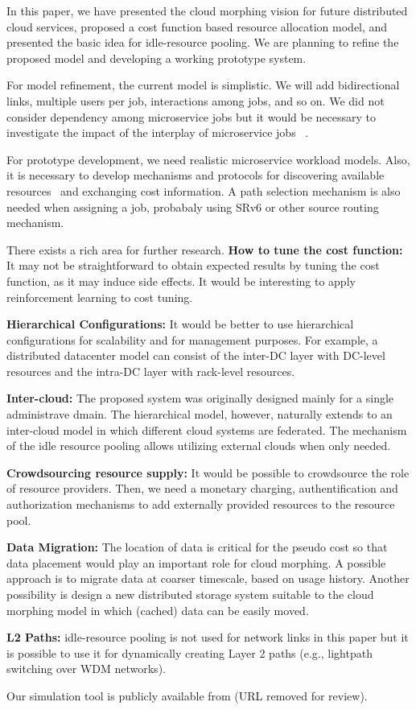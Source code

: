 
In this paper, we have presented the cloud morphing vision for
future distributed cloud services,
proposed a cost function based resource allocation model,
and presented the basic idea for idle-resource pooling.
We are planning to refine the proposed model and developing a working
prototype system.

For model refinement,
the current model is simplistic. We will add bidirectional links,
multiple users per job, interactions among jobs, and so on.
We did not consider dependency among microservice jobs but it would be
necessary to investigate the impact of the interplay of microservice
jobs ~\cite{Suresh-SOA-SOCC2017}.

For prototype development,
we need realistic microservice workload models.
Also, it is necessary to develop mechanisms and protocols for
discovering available resources~\cite{Albrecht2008} and exchanging
cost information.
A path selection mechanism is also needed when assigning a job,
probabaly using SRv6 or other source routing mechanism.

There exists a rich area for further research.
\noindent
{\bf How to tune the cost function:}  It may not be straightforward
to obtain expected results by tuning the cost function, as it may
induce side effects.
It would be interesting to apply reinforcement learning to cost
tuning.

\noindent
{\bf Hierarchical Configurations:} It would be better to use
hierarchical configurations for scalability and for management
purposes.
For example, a distributed datacenter model can consist of
the inter-DC layer with DC-level resources and the intra-DC layer
with rack-level resources.

\noindent
{\bf Inter-cloud:}
The proposed system was originally designed mainly for a single
administrave dmain.
The hierarchical model, however, naturally extends to an inter-cloud
model in which different cloud systems are federated.
The mechanism of the idle resource pooling allows utilizing external
clouds when only needed.

\noindent
{\bf Crowdsourcing resource supply:}
It would be possible to crowdsource the role of resource providers. 
Then, we need a monetary charging, authentification and authorization
mechanisms to add externally provided resources to the resource pool.

\noindent
{\bf Data Migration:}
The location of data is critical for the pseudo cost so that data
placement would play an important role for cloud morphing. 
A possible approach is to migrate data at coarser timescale, based
on usage history.
Another possibility is design a new distributed storage system
suitable to the cloud morphing model in which (cached) data can be
easily moved.

\noindent
{\bf L2 Paths:}
idle-resource pooling is not used for network links in this paper but
it is possible to use it for dynamically creating Layer 2 paths (e.g.,
lightpath switching over WDM networks).

Our simulation tool is publicly available from (URL removed for
review).
